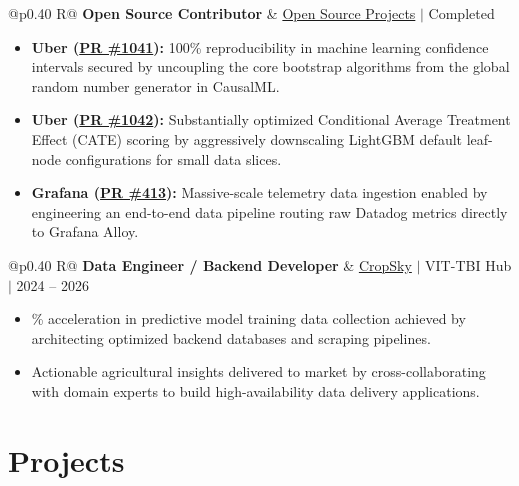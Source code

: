 \documentclass[a4paper,10pt]{article}
\newcommand{\ulink}[2]{\href{#1}{#2}}
\newcommand{\subheading}[1]{{\color[HTML]{0A0A0A}\fontsize{12}{14}\selectfont\bfseries #1}}
\newcommand{\meta}[1]{{\color[HTML]{5C5C5C}\fontsize{10.5}{12.5}\selectfont #1}}
\begin{document}
\begin{tabularx}{\linewidth}{@{}p{0.40\linewidth} R@{}}
\subheading{Open Source Contributor} & \meta{\ulink{https://github.com/su-jin1425/My-Open-Source-Contributions}{Open Source Projects} $|$ Completed}
\end{tabularx}
\begin{itemize}[nosep, leftmargin=1.5em, itemsep=2pt, topsep=2pt]
  \item {\color[HTML]{0A0A0A}\fontsize{11}{14}\selectfont \textbf{Uber (\ulink{https://github.com/uber/causalml/pull/1041}{PR \#1041}):} 100\% reproducibility in machine learning confidence intervals secured by uncoupling the core bootstrap algorithms from the global random number generator in CausalML.}
  \item {\color[HTML]{0A0A0A}\fontsize{11}{14}\selectfont \textbf{Uber (\ulink{https://github.com/uber/causalml/pull/1042}{PR \#1042}):} Substantially optimized Conditional Average Treatment Effect (CATE) scoring by aggressively downscaling LightGBM default leaf-node configurations for small data slices.}
  \item {\color[HTML]{0A0A0A}\fontsize{11}{14}\selectfont \textbf{Grafana (\ulink{https://github.com/grafana/alloy-scenarios/pull/413}{PR \#413}):} Massive-scale telemetry data ingestion enabled by engineering an end-to-end data pipeline routing raw Datadog metrics directly to Grafana Alloy.}
\end{itemize}

\begin{tabularx}{\linewidth}{@{}p{0.40\linewidth} R@{}}
\subheading{Data Engineer / Backend Developer} & \meta{\ulink{https://sites.google.com/view/cropsky/home}{CropSky} $|$ VIT-TBI Hub $|$ 2024 -- 2026}
\end{tabularx}
\begin{itemize}[nosep, leftmargin=1.5em, itemsep=2pt, topsep=2pt]
  \item {\color[HTML]{0A0A0A}\fontsize{11}{14}\% acceleration in predictive model training data collection achieved by architecting optimized backend databases and scraping pipelines.}
  \item {\color[HTML]{0A0A0A}\fontsize{11}{14}\selectfont Actionable agricultural insights delivered to market by cross-collaborating with domain experts to build high-availability data delivery applications.}
\end{itemize}


\section{Projects}
\vspace{2pt}
\end{document}
